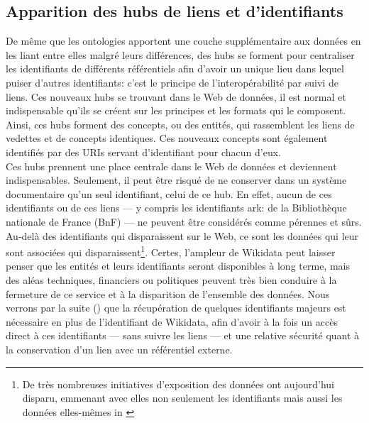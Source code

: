 \subsection{\label{III-A-2-b}Apparition des hubs de liens et d'identifiants}

De même que les ontologies apportent une couche supplémentaire aux données en les liant entre elles malgré leurs différences, des hubs se forment pour centraliser les identifiants de différents référentiels afin d'avoir un unique lieu dans lequel puiser d'autres identifiants: c'est le principe de l'interopérabilité par suivi de liens. Ces nouveaux hubs se trouvant dans le Web de données, il est normal et indispensable qu'ils se créent sur les principes et les formats qui le composent. Ainsi, ces hubs forment des concepts, ou des entités, qui rassemblent les liens de vedettes et de concepts identiques. Ces nouveaux concepts sont également identifiés par des URIs servant d'identifiant pour chacun d'eux.\\

Ces hubs prennent une place centrale dans le Web de données et deviennent indispensables. Seulement, il peut être risqué de ne conserver dans un système documentaire qu'un seul identifiant, celui de ce hub. En effet, aucun de ces identifiants ou de ces liens --- y compris les identifiants ark: de la Bibliothèque nationale de France (BnF) --- ne peuvent être considérés comme pérennes et sûrs. Au-delà des identifiants qui disparaissent sur le Web, ce sont les données qui leur sont associées qui disparaissent\footnote{\og De très nombreuses initiatives d’exposition des données ont aujourd’hui disparu, emmenant avec elles non seulement les identifiants mais aussi les données elles-mêmes\fg{} in \cite{poupeau_au-a_2018}}. Certes, l'ampleur de Wikidata peut laisser penser que les entités et leurs identifiants seront disponibles à long terme, mais des aléas techniques, financiers ou politiques peuvent très bien conduire à la fermeture de ce service et à la disparition de l'ensemble des données. Nous verrons par la suite () que la récupération de quelques identifiants majeurs est nécessaire en plus de l'identifiant de Wikidata, afin d'avoir à la fois un accès direct à ces identifiants --- sans suivre les liens --- et une relative sécurité quant à la conservation d'un lien avec un référentiel externe.\\

